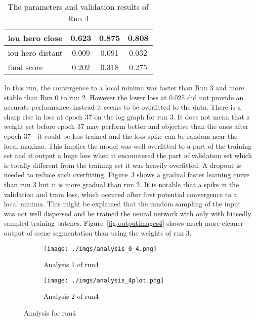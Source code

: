 \documentclass[paper=a4, fontsize=11pt]{scrartcl} %
\numberwithin{equation}{section} %
\numberwithin{figure}{section} %
\numberwithin{table}{section} %
\begin{document}
\begin{enumerate}
\begin{itemize}
{\begin{table}
\begin{center}
\begin{tabular}{ l | c | c | c }
		\hline \hline
		iou hero close & 0.623 & 0.875 & 0.808\\ \hline	  
		iou hero distant & 0.009 & 0.091 & 0.032\\ \hline
		final score & 0.202 & 0.318 & 0.275\\
		\hline
		\end{tabular}
		\caption{The parameters and validation results of Run 4}
		\label{tab:parameters4}
	\end{center}
\end{table}

In this run, the convergence to a local minima was faster than Run 3 and more stable than Run 0 to run 2. However the lower loss at 0.025 did not provide an accurate performance, instead it seems to be overfitted to the data. There is a sharp rise in loss at epoch 37 on the log graph for run 3. It does not mean that a weight set before epoch 37 may perform better and objective than the ones after epoch 37 - it could be less trained and the loss spike can be random near the local maxima. This implies the model was well overfitted to a part of the training set and it output a huge loss when it encountered the part of validation set which is totally different from the training set it was heavily overfitted. A dropout is needed to reduce such overfitting.
Figure~\ref{fig:AnalysisRun4} shows a gradual faster learning curve than run 3 but it is more gradual than run 2. It is notable that a spike in the validation and train loss, which occured after first potential convergence to a local minima. This might be explained that the random sampling of the input was not well dispersed and be trained the neural network with only with biasedly sampled training batches. Figure~\ref{fig:outputimages4} shows much more cleaner output of scene segmentation than using the weights of run 3.
\begin{figure}	
	\begin{subfigure}{0.45\textwidth}
	\texttt{[image: ./imgs/analysis\_0\_4.png]} 
	\caption{Analysis 1 of run4}
	\label{fig:subAnalysisRun4}
	\end{subfigure}
	\begin{subfigure}{0.45\textwidth}
	\texttt{[image: ./imgs/analysis\_4plot.png]}
	\caption{Analysis 2 of run4}
	\label{fig:subAnalysisRun4plot}
	\end{subfigure}
	 
	\caption{Analysis for run4}
	\label{fig:AnalysisRun4}
 \end{figure}
}
\end{itemize}
\end{enumerate}
\end{document}
